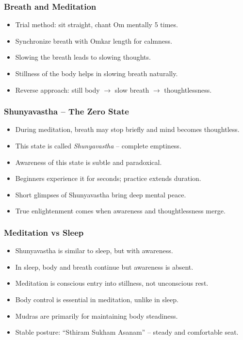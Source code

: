 \begin{frame}[fragile]\frametitle{Breath and Meditation}
      \begin{itemize}
        \item Trial method: sit straight, chant Om mentally 5 times.
        \item Synchronize breath with Omkar length for calmness.
        \item Slowing the breath leads to slowing thoughts.
        \item Stillness of the body helps in slowing breath naturally.
        \item Reverse approach: still body $\rightarrow$ slow breath $\rightarrow$ thoughtlessness.
      \end{itemize}
\end{frame}

\begin{frame}[fragile]\frametitle{Shunyavastha – The Zero State}
      \begin{itemize}
        \item During meditation, breath may stop briefly and mind becomes thoughtless.
        \item This state is called \textit{Shunyavastha} – complete emptiness.
        \item Awareness of this state is subtle and paradoxical.
        \item Beginners experience it for seconds; practice extends duration.
        \item Short glimpses of Shunyavastha bring deep mental peace.
        \item True enlightenment comes when awareness and thoughtlessness merge.
      \end{itemize}
\end{frame}

\begin{frame}[fragile]\frametitle{Meditation vs Sleep}
      \begin{itemize}
        \item Shunyavastha is similar to sleep, but with awareness.
        \item In sleep, body and breath continue but awareness is absent.
        \item Meditation is conscious entry into stillness, not unconscious rest.
        \item Body control is essential in meditation, unlike in sleep.
        \item Mudras are primarily for maintaining body steadiness.
        \item Stable posture: “Sthiram Sukham Asanam” – steady and comfortable seat.
      \end{itemize}
\end{frame}

